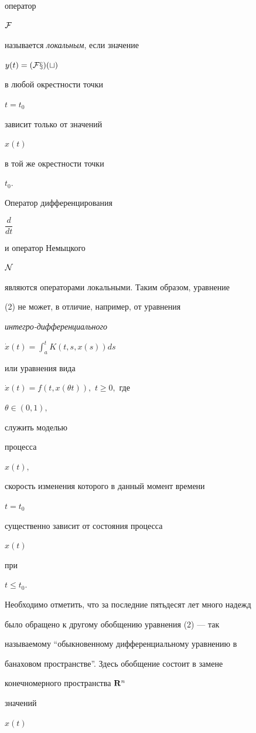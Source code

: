 оператор


$\cal F$


называется {\it локальным}, если значение


$y(t) = (\cal F x)(t)$


в любой окрестности точки


$t=t_0$


зависит только от значений


$x(t)$


в той же окрестности точки


$t_0.$


Оператор дифференцирования


$\dfrac{d}{dt}$


и оператор Немыцкого


$\cal N$


являются операторами локальными. Таким образом, уравнение


(2) не может, в отличие, например, от уравнения


{\it интегро-дифференциального}


$\Dot x (t) = \int_a^t K(t,s,x(s))ds$


или уравнения вида


$\Dot x (t) = f(t,x(\theta t)),$ $t\ge 0,$ где


$\theta\in(0,1),$


служить моделью


процесса


$x(t),$


скорость изменения которого в данный момент времени


$t = t_0$


существенно зависит от состояния процесса


$x(t)$


при


$t\le t_0.$





Необходимо отметить, что за последние пятьдесят лет много надежд


было обращено к другому обобщению уравнения (2) --- так


называемому ``обыкновенному дифференциальному уравнению в


банаховом пространстве''. Здесь обобщение состоит в замене


конечномерного пространства $\bold R^n$


значений


$x(t)$



